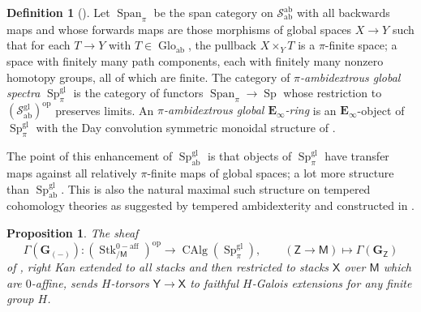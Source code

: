 \documentclass[11pt, a4paper]{article}
\newcommand{\ab}{\mathrm{ab}}
\newcommand{\aff}{\mathrm{aff}}
\newcommand{\gl}{\mathrm{gl}}
\newcommand{\1}{\mathbf{1}}
\DeclareMathOperator{\CAlg}{CAlg}
\DeclareMathOperator{\Glo}{Glo}
\DeclareMathOperator{\Span}{Span}
\DeclareMathOperator{\Stk}{Stk}
\DeclareMathOperator{\Sp}{Sp}
\newcommand{\Spc}{\mathcal{S}}
\newcommand{\op}{\mathrm{op}}
\newcommand{\E}{\mathbf{E}}
\newcommand{\G}{\mathbf{G}}
\newcommand{\M}{\mathsf{M}}
\newcommand{\X}{\mathsf{X}}
\newcommand{\Y}{\mathsf{Y}}
\newcommand{\sfZ}{\mathsf{Z}}
\newcommand{\Ga}{\Gamma}
\theoremstyle{plain}
\newtheorem{prop}[equation]{Proposition}
\theoremstyle{definition}
\newtheorem{mydef}[equation]{Definition}
\theoremstyle{remark}\numberwithin{equation}{section}
\begin{document}
\begin{mydef}[{\cite[Def.1.2.2]{temperedglobal}}]\label{df:ofpiambi}
    Let $\Span_\pi$ be the span category on $\Spc_\ab^\ab$ with all backwards maps and whose forwards maps are those morphisms of global spaces $X\to Y$ such that for each $T\to Y$ with $T\in \Glo_\ab$, the pullback $X\times_Y T$ is a $\pi$-finite space; a space with finitely many path components, each with finitely many nonzero homotopy groups, all of which are finite. The category of \emph{$\pi$-ambidextrous global spectra} $\Sp_\pi^\gl$ is the category of functors $\Span_\pi \to \Sp$ whose restriction to $(\Spc_\ab^\gl)^\op$ preserves limits. An \emph{$\pi$-ambidextrous global $\E_\infty$-ring} is an $\E_\infty$-object of $\Sp_\pi^\gl$ with the Day convolution symmetric monoidal structure of \cite[Cor.2.2.3]{temperedglobal}.
\end{mydef}

The point of this enhancement of $\Sp^\gl_\ab$ is that objects of $\Sp^\gl_\pi$ have transfer maps against all relatively $\pi$-finite maps of global spaces; a lot more structure than $\Sp^\gl_\ab$. This is also the natural maximal such structure on tempered cohomology theories as suggested by tempered ambidexterity \cite[Thm.7.2.10]{ec3} and constructed in \cite[Thm.1.1.1]{temperedglobal}.

\begin{prop}\label{pr:general_torsors_to_global_Galois}
    The sheaf
    \[\Ga(\G_{(-)}) \colon (\Stk^{0-\aff}_{/\M})^\op \to \CAlg(\Sp^\gl_\pi), \qquad (\sfZ \to \M)\mapsto \Ga(\G_\sfZ)\]
    of \cite[Thm.1.1.1]{temperedglobal}, right Kan extended to all stacks and then restricted to stacks $\X$ over $\M$ which are $0$-affine, sends $H$-torsors $\Y \to \X$ to faithful $H$-Galois extensions for any finite group $H$.
\end{prop}
\end{document}
